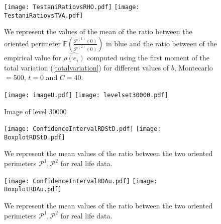 \documentclass[12pt]{article}
\renewcommand{\hat}{\widehat}
\theoremstyle{Theorem}
\begin{document}
\begin{figure}[H]
  \centering
    {\texttt{[image: TestaniRatiovsRHO.pdf]}}
    {\texttt{[image: TestaniRatiovsTVA.pdf]}}
    \hspace{0.2cm} 
 \caption{We represent the values of the mean of the ratio between the oriented perimeter $\mathbb{E}\left(\frac{\mathcal{P}^{(1)}(0)}{\mathcal{P}^{(2)}(0)}\right)$ in blue and the ratio between of the empirical value for $\hat{\rho(e_i)}$ computed using the first moment of the total variation (\ref{totalvariation}) for different values of $b$, Montecarlo $= 500$, $t = 0$ and $C = 40$.}
\label{fig2}
\end{figure}


\begin{figure}[H]
  \centering
    {\texttt{[image: imageU.pdf]}}
    \hspace{3cm}
    {\texttt{[image: levelset30000.pdf]}}
    \hspace{0.2cm}
 \caption{ Image of level $30000$}
\label{fig2}
\end{figure}

\begin{figure}[H]
  \centering
    {\texttt{[image: ConfidenceIntervalRDStD.pdf]}}
    {\texttt{[image: BoxplotRDStD.pdf]}}
    \hspace{0.2cm}
 \caption{We represent the mean values of the ratio between the two oriented perimeters $\mathcal{P}^{1}, \mathcal{P}^{2}$ for real life data.}
\label{fig2}
\end{figure}


\begin{figure}[H]
  \centering
    {\texttt{[image: ConfidenceIntervalRDAu.pdf]}}
    {\texttt{[image: BoxplotRDAu.pdf]}}
    \hspace{0.2cm}
 \caption{We represent the mean values of the ratio between the two oriented perimeters $\mathcal{P}^{1}, \mathcal{P}^{2}$ for real life data.}
\label{fig2}
\end{figure}


\end{document}
